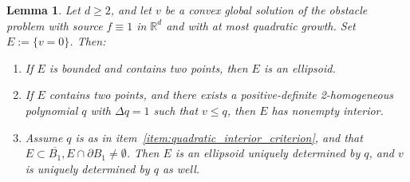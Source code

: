 \documentclass[11pt]{amsart}
\numberwithin{equation}{section}
\numberwithin{figure}{section}
\theoremstyle{plain}
\newtheorem{lem}[thm]{Lemma}
\theoremstyle{definition}
\theoremstyle{remark}
\theoremstyle{plain}
\def\R{\mathbb{R}}
\begin{document}
\begin{lem}\label{lem:ellipsoid_blowup}
Let $d\geq2$, and let $v$ be a convex global solution of the
obstacle problem with source $f\equiv1$ in $\R^d$ and with at most
quadratic growth. Set $E:=\{v=0\}$. Then:
\begin{enumerate}[label=(\roman*)]
    \item\label{item:ellipsoid_2_pt_criterion} If $E$ is bounded and contains two points, then $E$ is an ellipsoid.
    \item\label{item:quadratic_interior_criterion} If $E$ contains two points, and there exists a positive-definite 2-homogeneous polynomial $q$ with $\Delta q = 1$ such that $v\leq q$, then $E$ has nonempty interior.
    \item\label{item:ellipsoid_unique} Assume $q$ is as in item~\ref{item:quadratic_interior_criterion}, and that $E\subset \overline{B_1}, E\cap \partial B_1\neq \emptyset$. Then $E$ is an ellipsoid uniquely determined by $q$, and $v$ is uniquely determined by $q$ as well.
\end{enumerate}
\end{lem}
\end{document}
